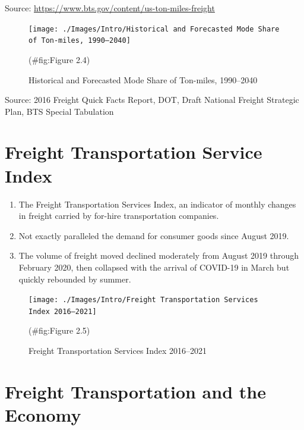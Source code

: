 \documentclass[
]{book}
\begin{document}
Source: \url{https://www.bts.gov/content/us-ton-miles-freight}

\begin{figure}

{\centering \texttt{[image: ./Images/Intro/Historical and Forecasted Mode Share of Ton-miles, 1990–2040]} 

}

\caption{Historical and Forecasted Mode Share of Ton-miles, 1990–2040}(\#fig:Figure 2.4)
\end{figure}

Source: 2016 Freight Quick Facts Report, DOT, Draft National Freight Strategic Plan, BTS Special Tabulation

\hypertarget{ntro-Freight_Index}{%
\section{Freight Transportation Service Index}\label{ntro-Freight_Index}}

\begin{enumerate}
\def\labelenumi{\arabic{enumi})}
\item
  The Freight Transportation Services Index, an indicator of monthly changes in freight carried by for-hire transportation companies.
\item
  Not exactly paralleled the demand for consumer goods since August 2019.
\item
  The volume of freight moved declined moderately from August 2019 through February 2020, then collapsed with the arrival of COVID-19 in March but quickly rebounded by summer.
\end{enumerate}

\begin{figure}

{\centering \texttt{[image: ./Images/Intro/Freight Transportation Services Index 2016–2021]} 

}

\caption{Freight Transportation Services Index 2016–2021}(\#fig:Figure 2.5)
\end{figure}

\hypertarget{intro-Freight_economy}{%
\section{Freight Transportation and the Economy}\label{intro-Freight_economy}}
\end{document}
